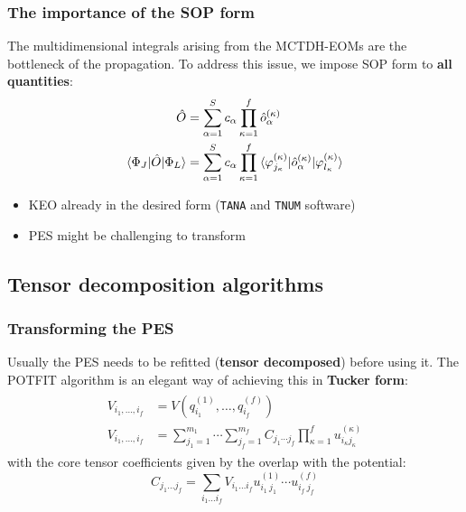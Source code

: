 \documentclass{beamer}
\begin{document}
\begin{frame}[fragile]
  \frametitle{The importance of the SOP form}
  \vspace{-.5cm}
  The multidimensional integrals arising from the MCTDH-EOMs are the bottleneck of the propagation. To address this issue, we impose SOP form to \textbf{all quantities}:
\begin{align}
\begin{split}
\hat{O} &= \sum_{\alpha=1}^S c_{\alpha} \prod_{\kappa=1}^f \hat{o}_{\alpha}^{(\kappa)} \\
\braket{\Phi_J|\hat{O}|\Phi_L} &= \sum_{\alpha=1}^S c_{\alpha} \prod_{\kappa=1}^f \braket{\varphi_{j_{\kappa}}^{(\kappa)}|\hat{o}_{\alpha}^{(\kappa)}|\varphi_{l_{\kappa}}^{(\kappa)}}
\end{split}
\end{align}
\begin{block}{}
  \begin{itemize}
  \item KEO already in the desired form (\verb|TANA| and \verb|TNUM| software)
  \item PES might be challenging to transform
  \end{itemize}
\end{block}
\end{frame}

\subsection{Tensor decomposition algorithms}\label{tdec}

\begin{frame}
  \frametitle{Transforming the PES}
  Usually the PES needs to be refitted (\textbf{tensor decomposed}) before using it. The POTFIT algorithm is an elegant way of achieving this in \textbf{Tucker form}:
  \begin{align}
    \label{potfit}
    \begin{split}
     V_{i_1,\ldots,i_f} &= V(q^{(1)}_{i_1},\ldots,q^{(f)}_{i_f}) \\
	V_{i_1,\ldots,i_f} &= \sum_{j_1=1}^{m_1} \cdots \sum_{j_f=1}^{m_f} C_{j_1 \cdots j_f}\prod_{\kappa=1}^f u_{i_{\kappa}j_{\kappa}}^{(\kappa)}
    \end{split}
  \end{align}
  with the core tensor coefficients given by the overlap with the potential:
\begin{equation}
  \label{core}
   C_{j_1\ldots j_f} = \sum_{i_1\ldots i_f} V_{i_1\ldots i_f} u^{(1)}_{i_1\ j_1} \cdots u^{(f)}_{i_f\ j_f}
\end{equation}
 
\end{frame}
\end{document}
